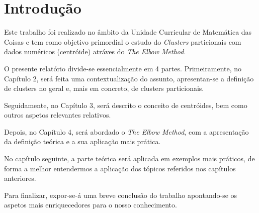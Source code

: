 \documentclass[12pt, a4paper, oneside]{scrreport}
\begin{document}

\renewcommand*\contentsname{Índice}
\tableofcontents

\renewcommand{\listfigurename}{Lista de Ilustrações}
\listoffigures

\renewcommand{\listtablename}{Tabelas}
\listoftables

\newpage

\setlength{\leftmargini}{-0,35cm}
\setlength{\leftmarginii}{-0,35cm}

\renewcommand{\chaptermark}[1]{\markboth{#1}{}}
\ofoot*{\color{gray} \leftmark\hspace{0.25cm}|\hspace{0.25cm}\thepage}


\renewcommand{\abstractname}{Sumário} 


\chapter{Introdução}



Este trabalho foi realizado no âmbito da Unidade Curricular de Matemática das Coisas e tem como objetivo primordial o estudo do \textit{Clusters} particionais com dados numéricos (centróide) atráves do  \textit{The Elbow Method}.\par
O presente relatório divide-se essencialmente em 4 partes. Primeiramente, no Capítulo 2, será feita uma contextualização do assunto, apresentan-se a definição de clusters no geral e, mais em concreto, de clusters particionais.\par
Seguidamente, no Capítulo 3, será descrito o conceito de centróides, bem como outros aspetos relevantes relativos.\par
Depois, no Capítulo 4, será abordado o \textit{The Elbow Method}, com a apresentação da definição teórica e a sua aplicação mais prática.\par
No capítulo seguinte, a parte teórica será aplicada em exemplos mais práticos, de forma a melhor entendermos a aplicação dos tópicos referidos nos capítulos anteriores.\par 
Para finalizar, expor-se-á uma breve conclusão do trabalho apontando-se os aspetos mais enriquecedores para o nosso conhecimento.
\end{document}
